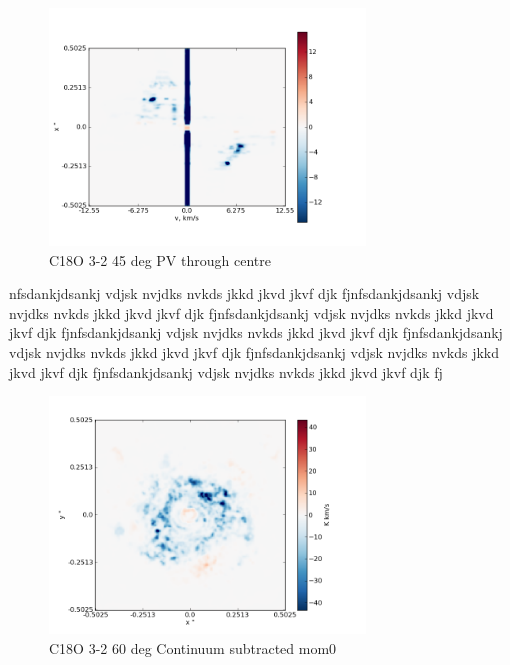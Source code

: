 \documentclass[useAMS,usenatbib]{mn2e}
\begin{document}
\begin{figure}
 \includegraphics[width=84mm]{Figures/sim/imageC18O_3-2_45deg_PV_centre.png}

 \caption{C18O 3-2 45 deg PV through centre}
\end{figure}

nfsdankjdsankj vdjsk nvjdks nvkds jkkd jkvd jkvf djk fj\newline nfsdankjdsankj vdjsk nvjdks nvkds jkkd jkvd jkvf djk fj\newline nfsdankjdsankj vdjsk nvjdks nvkds jkkd jkvd jkvf djk fj\newline nfsdankjdsankj vdjsk nvjdks nvkds jkkd jkvd jkvf djk fj\newline nfsdankjdsankj vdjsk nvjdks nvkds jkkd jkvd jkvf djk fj\newline nfsdankjdsankj vdjsk nvjdks nvkds jkkd jkvd jkvf djk fj\newline nfsdankjdsankj vdjsk nvjdks nvkds jkkd jkvd jkvf djk fj\newline 

\begin{figure}
 \includegraphics[width=84mm]{Figures/sim/imageC18O_3-2_60deg_contSub.png}

 \caption{C18O 3-2 60 deg Continuum subtracted mom0}
\end{figure}
\end{document}
